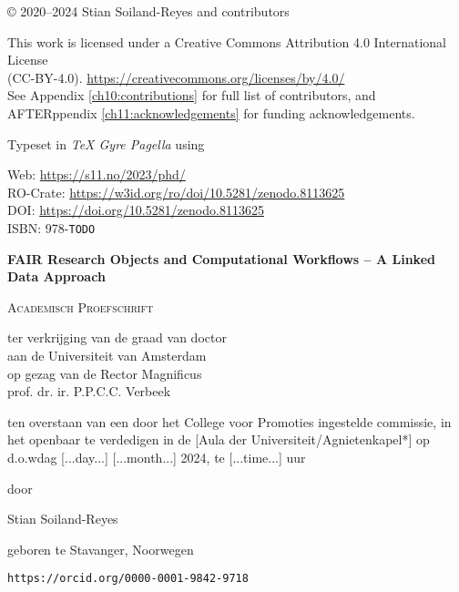 \newpage

\vspace*{\fill}

© 2020--2024 Stian Soiland-Reyes and contributors

This work is licensed under a Creative Commons Attribution 4.0 International License \\
(CC-BY-4.0). \url{https://creativecommons.org/licenses/by/4.0/}\\
See Appendix \ref{ch10:contributions} for full list of contributors, and AFTERppendix \ref{ch11:acknowledgements} for funding acknowledgements.


Typeset in \emph{TeX Gyre Pagella} using \mybanner

Web: \url{https://s11.no/2023/phd/} \\
RO-Crate: \url{https://w3id.org/ro/doi/10.5281/zenodo.8113625}\\
DOI: \url{https://doi.org/10.5281/zenodo.8113625}\\
ISBN: 978-\texttt{TODO}

\newpage
\thispagestyle{empty} 

\begin{center}

    
\Huge
\textbf{FAIR Research Objects and Computational Workflows – A Linked Data Approach}
     
\vspace*{\fill}

\LARGE
\textsc{Academisch Proefschrift}

\vspace*{\fill}

\large
{ \itshape

ter verkrijging van de graad van doctor\\
aan de Universiteit van Amsterdam\\
op gezag van de Rector Magnificus\\
prof. dr. ir. P.P.C.C. Verbeek

ten overstaan van een door het College voor Promoties ingestelde commissie,
in het openbaar te verdedigen in de [Aula der Universiteit/Agnietenkapel*]
op d.o.wdag [...day...] [...month...] 2024, te [...time...] uur

door 
}

\vspace*{\fill}

\LARGE
Stian Soiland-Reyes

\large
geboren te Stavanger, Noorwegen 

\texttt{https://orcid.org/0000-0001-9842-9718} 
\end{center}

